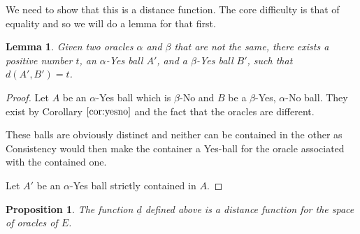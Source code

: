 \documentclass[12pt]{article}
\newtheorem{lemma}{Lemma}[section]
\newtheorem{proposition}{Proposition}[section]
\begin{document}
We need to show that this is a distance function. The core difficulty is that of equality and so we will do a lemma for that first. 

\begin{lemma}
    Given two oracles $\alpha$ and $\beta$ that are not the same, there exists a positive number $t$, an $\alpha$-Yes ball $A'$, and a $\beta$-Yes ball $B'$, such that $d(A', B') = t$.
\end{lemma}

\begin{proof}
     Let $A$ be an $\alpha$-Yes ball which is $\beta$-No and $B$ be a $\beta$-Yes, $\alpha$-No ball. They exist by Corollary $\ref{cor:yesno}$ and the fact that the oracles are different. 

     These balls are obviously distinct and neither can be contained in the other as Consistency would then make the container a Yes-ball for the oracle associated with the contained one. 

     Let $A'$ be an $\alpha$-Yes ball strictly contained in $A$. 

     
\end{proof}


\begin{proposition}
    The function $\underline{d}$ defined above is a distance function for the space of oracles of $E$. 
\end{proposition}
\end{document}
